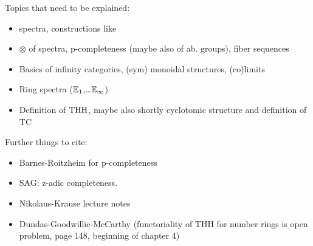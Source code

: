 Topics that need to be explained:
\begin{itemize}
    \item spectra, constructions like 
    \item $\otimes$ of spectra, p-completeness (maybe also of ab. groups), fiber sequences
    \item Basics of infinity categories, (sym) monoidal structures, (co)limits
    \item Ring spectra ($\mathbb{E}_1$,\dots $\mathbb{E}_\infty$)
    \item Definition of $\operatorname{THH}$, maybe also shortly cyclotomic structure and definition of TC
\end{itemize}

Further things to cite:
\begin{itemize}
    \item Barnes-Roitzheim for p-completeness
    \item SAG: z-adic completeness.
    \item Nikolaus-Krause lecture notes
    \item Dundas-Goodwillie-McCarthy (functoriality of THH for number rings is open problem, page 148, beginning of chapter 4)
\end{itemize}